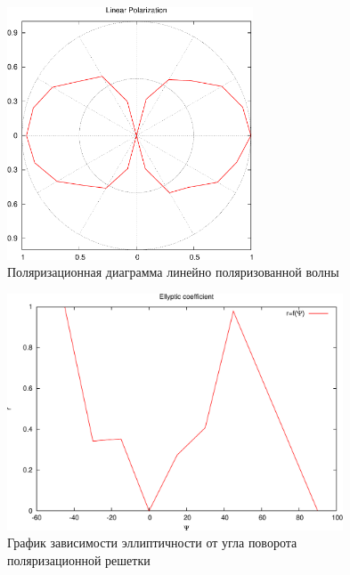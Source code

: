 \documentclass[11pt,a4paper,oneside, reqno]{amsproc}
\begin{document}
\begin{figure}[hb!]
    \begin{center}
        \includegraphics[width=0.65\textwidth]{data1.pdf}
    \end{center}
    \caption{Поляризационная диаграмма линейно поляризованной волны}
    \label{fig:plot1}
\end{figure}

\begin{figure}[hb!]
    \begin{center}
        \includegraphics[width=0.89\textwidth]{data3.pdf}
    \end{center}
    \caption{График зависимости эллиптичности от угла поворота поляризационной решетки}
    \label{fig:plot3}
\end{figure}
\end{document}
